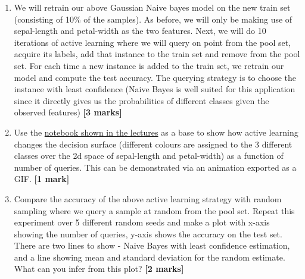 \documentclass[colorlinks,linkcolor=true]{article}
\begin{document}
\begin{enumerate}
\begin{enumerate}
\begin{enumerate}
	\item We will retrain our above Gaussian Naive bayes model on the new train set (consisting of 10\% of the samples). As before, we will only be making use of sepal-length and petal-width as the two features. Next, we will do 10 iterations of active learning where we will query on point from the pool set, acquire its labels, add that instance to the train set and remove from the pool set. For each time a new instance is added to the train set, we retrain our model and compute the test accuracy. The querying strategy is to choose the instance with least confidence (Naive Bayes is well suited for this application since it directly gives us the probabilities of different classes given the observed features) \textbf{[3 marks]}
	
	\item Use the \href{https://colab.research.google.com/github/nipunbatra/nipunbatra.github.io/blob/master/blog/2019/active-learning-motivation.ipynb}{notebook shown in the lectures} as a base to show how active learning changes the decision surface (different colours are assigned to the 3 different classes over the 2d space of sepal-length and petal-width) as a function of number of queries. This can be demonstrated via an animation exported as a GIF.  \textbf{[1 mark]}
	
	\item Compare the accuracy of the above active learning strategy with random sampling where we query a sample at random from the pool set. Repeat this experiment over 5 different random seeds and make a plot with x-axis showing the number of queries, y-axis shows the accuracy on the test set. There are two lines to show - Naive Bayes with least confidence estimation, and a line showing mean and standard deviation for the random estimate. What can you infer from this plot? \textbf{[2 marks]}
	
\end{enumerate}

\end{enumerate}
\end{enumerate}
\end{document}
